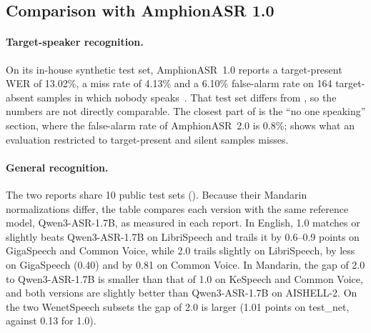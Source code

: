 \subsection{Comparison with AmphionASR 1.0}
\label{subsec:related_v1}

\paragraph{Target-speaker recognition.}
On its in-house synthetic test set, AmphionASR~1.0 reports a target-present WER of 13.02\%, a miss rate of 4.13\% and a 6.10\% false-alarm rate on 164 target-absent samples in which nobody speaks~\cite{amphion2026amphionasr}.
That test set differs from \tsbench, so the numbers are not directly comparable.
The closest part of \tsbench is the ``no one speaking'' section, where the false-alarm rate of AmphionASR~2.0 is 0.8\%;  shows what an evaluation restricted to target-present and silent samples misses.

\paragraph{General recognition.}
The two reports share 10 public test sets ().
Because their Mandarin normalizations differ, the table compares each version with the same reference model, Qwen3-ASR-1.7B, as measured in each report.
In English, 1.0 matches or slightly beats Qwen3-ASR-1.7B on LibriSpeech and trails it by 0.6--0.9 points on GigaSpeech and Common Voice, while 2.0 trails slightly on LibriSpeech, by less on GigaSpeech (0.40) and by 0.81 on Common Voice.
In Mandarin, the gap of 2.0 to Qwen3-ASR-1.7B is smaller than that of 1.0 on KeSpeech and Common Voice, and both versions are slightly better than Qwen3-ASR-1.7B on AISHELL-2.
On the two WenetSpeech subsets the gap of 2.0 is larger (1.01 points on test\_net, against 0.13 for 1.0).

